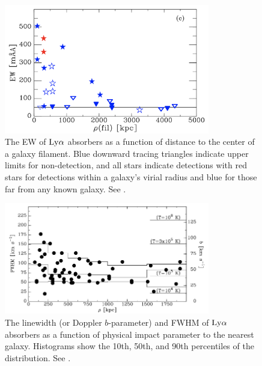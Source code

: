 \begin{figure}[ht!]
        \centering
        \vspace{0pt}
        \includegraphics[width=0.8\textwidth]{Introduction/figures/Wakker2015_filament_EW.png}
        \caption{\small{The EW of $\rm Ly\alpha$ absorbers as a function of distance to the center of a galaxy filament. Blue downward tracing triangles indicate upper limits for non-detection, and all stars indicate detections with red stars for detections within a galaxy's virial radius and blue for those far from any known galaxy. See \cite{wakker2015}.}}
        \vspace{5pt}
        \label{wakker_filament}
\end{figure}

\begin{figure}[ht!]
        \centering
        \vspace{0pt}
        \includegraphics[width=0.8\textwidth]{Introduction/figures/bart_moneyplot.png}
        \caption{\small{The linewidth (or Doppler $b$-parameter) and FWHM of $\rm Ly\alpha$ absorbers as a function of physical impact parameter to the nearest galaxy. Histograms show the 10th, 50th, and 90th percentiles of the distribution.  See \cite{wakker2009}.}}
        \vspace{5pt}
        \label{wakker2009_linewidth}
\end{figure}

